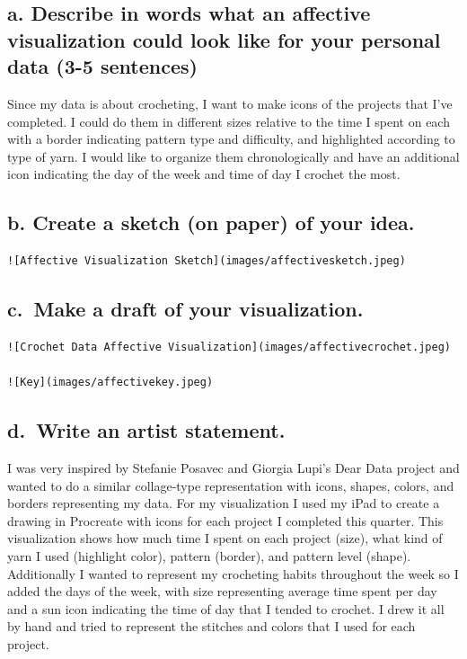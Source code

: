\documentclass[
  letterpaper,
  DIV=11,
  numbers=noendperiod]{scrartcl}
\begin{document}
\subsection{a. Describe in words what an affective visualization could
look like for your personal data (3-5
sentences)}\label{a.-describe-in-words-what-an-affective-visualization-could-look-like-for-your-personal-data-3-5-sentences}

Since my data is about crocheting, I want to make icons of the projects
that I've completed. I could do them in different sizes relative to the
time I spent on each with a border indicating pattern type and
difficulty, and highlighted according to type of yarn. I would like to
organize them chronologically and have an additional icon indicating the
day of the week and time of day I crochet the most.

\subsection{b. Create a sketch (on paper) of your
idea.}\label{b.-create-a-sketch-on-paper-of-your-idea.}

\begin{verbatim}
![Affective Visualization Sketch](images/affectivesketch.jpeg)
\end{verbatim}

\subsection{c.~Make a draft of your
visualization.}\label{c.-make-a-draft-of-your-visualization.}

\begin{verbatim}
![Crochet Data Affective Visualization](images/affectivecrochet.jpeg)

![Key](images/affectivekey.jpeg)
\end{verbatim}

\subsection{d.~Write an artist
statement.}\label{d.-write-an-artist-statement.}

I was very inspired by Stefanie Posavec and Giorgia Lupi's Dear Data
project and wanted to do a similar collage-type representation with
icons, shapes, colors, and borders representing my data. For my
visualization I used my iPad to create a drawing in Procreate with icons
for each project I completed this quarter. This visualization shows how
much time I spent on each project (size), what kind of yarn I used
(highlight color), pattern (border), and pattern level (shape).
Additionally I wanted to represent my crocheting habits throughout the
week so I added the days of the week, with size representing average
time spent per day and a sun icon indicating the time of day that I
tended to crochet. I drew it all by hand and tried to represent the
stitches and colors that I used for each project.
\end{document}
